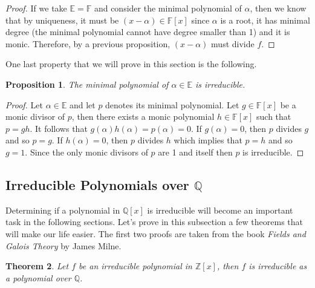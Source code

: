 \documentclass{article}
\theoremstyle{plain}
\newtheorem{theorem}{Theorem}[subsection]
\newtheorem{proposition}[theorem]{Proposition}
\theoremstyle{definition}
\newcommand{\Q}{\mathbb{Q}}
\newcommand{\Z}{\mathbb{Z}}
\newcommand{\F}{\mathbb{F}}
\newcommand{\E}{\mathbb{E}}
\begin{document}
\begin{proof}
    If we take $\E = \F$ and consider the minimal polynomial of $\alpha$, then we know that by uniqueness, it must be $(x - \alpha) \in \F[x]$ since $\alpha$ is a root, it has minimal degree (the minimal polynomial cannot have degree smaller than 1) and it is monic. Therefore, by a previous proposition, $(x - \alpha)$ must divide $f$.
\end{proof}

One last property that we will prove in this section is the following.

\begin{proposition}
    The minimal polynomial of $\alpha \in \E$ is irreducible.
\end{proposition}

\begin{proof}
    Let $\alpha \in \E$ and let $p$ denotes its minimal polynomial. Let $g \in \F[x]$ be a monic divisor of $p$, then there exists a monic polynomial $h \in \F[x]$ such that $p = gh$. It follows that $g(\alpha)h(\alpha) = p(\alpha) = 0$. If $g(\alpha) = 0$, then $p$ divides $g$ and so $p = g$. If $h(\alpha) = 0$, then $p$ divides $h$ which implies that $p = h$ and so $g = 1$. Since the only monic divisors of $p$ are 1 and itself then $p$ is irreducible.
\end{proof}

\subsection{Irreducible Polynomials over $\Q$}

Determining if a polynomial in $\Q[x]$ is irreducible will become an important task in the following sections. Let's prove in this subsection a few theorems that will make our life easier. The first two proofs are taken from the book \textit{Fields and Galois Theory} by James Milne.

\begin{theorem}
    Let $f$ be an irreducible polynomial in $\Z[x]$, then $f$ is irreducible as a polynomial over $\Q$.
\end{theorem}
\end{document}
